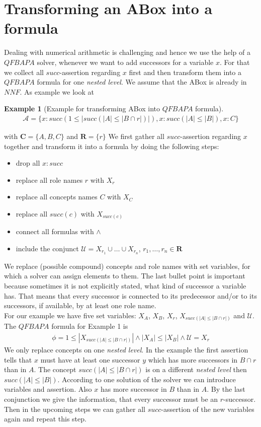 \documentclass{book}
\theoremstyle{break}
\theoremstyle{definition}
\newtheorem{ex}{Example}
\begin{document}
\section{Transforming an ABox into a formula}
Dealing with numerical arithmetic is challenging and hence we use the help of a $QFBAPA$ solver, whenever we want to add successors for a variable $x$. For that we collect all $succ$-assertion regarding $x$ first and then transform them into a $QFBAPA$ formula for one \textit{nested level}. We assume that the ABox is already in $NNF$. As example we look at
\begin{ex}[Example for transforming ABox into $QFBAPA$ formula]
\begin{align*}
\mathcal{A}=\{x:succ(1\leq|succ(|A|\leq|B\cap r|)|), x:succ(|A|\leq |B|), x:C\}
\end{align*}
\end{ex}
with $\mathbf{C}=\{A,B,C\}$ and $\mathbf{R}=\{r\}$
We first gather all $succ$-assertion regarding $x$ together and transform it into a formula by doing the following steps:
\begin{itemize}
\item drop all $x:succ$
\item replace all role names $r$ with $X_r$
\item replace all concepts names $C$ with $X_C$
\item replace all $succ(c)$ with $X_{succ(c)}$
\item connect all formulas with $\wedge$
\item include the conjunct $\mathcal{U}=X_{r_1}\cup\dots\cup X_{r_n}$, $r_1,\dots, r_n\in\mathbf{R}$
\end{itemize}
We replace (possible compound) concepts and role names with set variables, for which a solver can assign elements to them. The last bullet point is important because sometimes it is not explicitly stated, what kind of successor a variable has. That means that every successor is connected to its predecessor and/or to its successors, if available, by at least one role name.\\
For our example we have five set variables: $X_A$, $X_B$, $X_r$, $X_{succ(|A|\leq |B\cap r|)}$ and $\mathcal{U}$. The $QFBAPA$ formula for Example 1 is 
\begin{align}\label{f}
\phi=1\leq |X_{succ(|A|\leq |B\cap r|)}|\wedge |X_A|\leq |X_B|\wedge \mathcal{U}=X_r
\end{align}
We only replace concepts on one \textit{nested level}. In the example the first assertion tells that $x$ must have at least one successor $y$ which has more successors in $B\cap r$ than in $A$. The concept $succ(|A|\leq|B\cap r|)$ is on a different \textit{nested level} then $succ(|A|\leq |B|)$. According to one solution of the solver we can introduce variables and assertion. Also $x$ has more successor in $B$ than in $A$. By the last conjunction we give the information, that every successor must be an $r$-successor. Then in the upcoming steps we can gather all $succ$-assertion of the new variables again and repeat this step.
\end{document}
